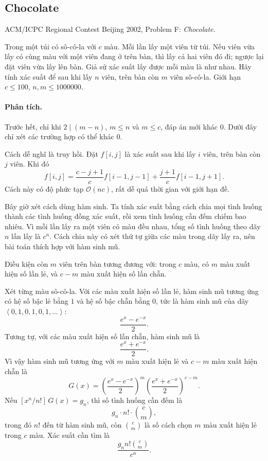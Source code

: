 \documentclass[11pt]{article}
\newcommand{\Oh}{\mathcal{O}}
\newcommand{\seq}[1]{\left\langle #1\right\rangle}
\newcommand{\egfcoef}[2]{[x^{#2}/#2!]\,#1}
\newcommand{\C}[2]{\binom{#1}{#2}}
\begin{document}
\subsection{Chocolate}

ACM/ICPC Regional Contest Beijing 2002, Problem F: \textit{Chocolate}.

Trong một túi có sô-cô-la với \(c\) màu. Mỗi lần lấy một viên từ túi. Nếu viên
vừa lấy có cùng màu với một viên đang ở trên bàn, thì lấy cả hai viên đó đi;
ngược lại đặt viên vừa lấy lên bàn. Giả sử xác suất lấy được mỗi màu là như
nhau. Hãy tính xác suất để sau khi lấy \(n\) viên, trên bàn còn \(m\) viên
sô-cô-la. Giới hạn \(c\le 100\), \(n,m\le 1000000\).

\paragraph{Phân tích.}
Trước hết, chỉ khi \(2\mid (m-n)\), \(m\le n\) và \(m\le c\), đáp án mới khác
\(0\). Dưới đây chỉ xét các trường hợp có thể khác \(0\).

Cách dễ nghĩ là truy hồi. Đặt \(f[i,j]\) là xác suất sau khi lấy \(i\) viên,
trên bàn còn \(j\) viên. Khi đó
\[
  f[i,j]=\frac{c-j+1}{c}f[i-1,j-1]+\frac{j+1}{c}f[i-1,j+1].
\]
Cách này có độ phức tạp \(\Oh(nc)\), rất dễ quá thời gian với giới hạn đề.

Bây giờ xét cách dùng hàm sinh. Ta tính xác suất bằng cách chia mọi tình huống
thành các tình huống đồng xác suất, rồi xem tình huống cần đếm chiếm bao
nhiêu. Vì mỗi lần lấy ra một viên có màu đều nhau, tổng số tình huống theo
dãy \(n\) lần lấy là \(c^n\). Cách chia này có xét thứ tự giữa các màu trong
dãy lấy ra, nên bài toán thích hợp với hàm sinh mũ.

Điều kiện còn \(m\) viên trên bàn tương đương với: trong \(c\) màu, có \(m\)
màu xuất hiện số lần lẻ, và \(c-m\) màu xuất hiện số lần chẵn.

Xét từng màu sô-cô-la. Với các màu xuất hiện số lần lẻ, hàm sinh mũ tương ứng
có hệ số bậc lẻ bằng \(1\) và hệ số bậc chẵn bằng \(0\), tức là hàm sinh mũ
của dãy \(\seq{0,1,0,1,0,1,\ldots}\):
\[
  \frac{e^x-e^{-x}}2.
\]
Tương tự, với các màu xuất hiện số lần chẵn, hàm sinh mũ là
\[
  \frac{e^x+e^{-x}}2.
\]
Vì vậy hàm sinh mũ tương ứng với \(m\) màu xuất hiện lẻ và \(c-m\) màu xuất
hiện chẵn là
\[
  G(x)=\left(\frac{e^x-e^{-x}}2\right)^m
       \left(\frac{e^x+e^{-x}}2\right)^{c-m}.
\]
Nếu \(\egfcoef{G(x)}{n}=g_n\), thì số tình huống cần đếm là
\[
  g_n\cdot n!\cdot \C{c}{m},
\]
trong đó \(n!\) đến từ hàm sinh mũ, còn \(\C{c}{m}\) là số cách chọn \(m\)
màu xuất hiện lẻ trong \(c\) màu. Xác suất cần tìm là
\[
  \frac{g_n n!\C{c}{m}}{c^n}.
\]
\end{document}
